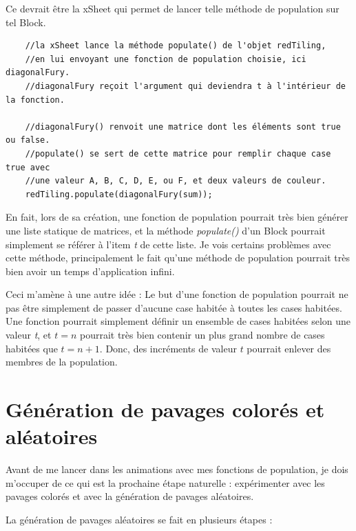 Ce devrait être la xSheet qui permet de lancer telle méthode de population sur tel Block.
\begin{lstlisting}
    //la xSheet lance la méthode populate() de l'objet redTiling, 
    //en lui envoyant une fonction de population choisie, ici diagonalFury.
    //diagonalFury reçoit l'argument qui deviendra t à l'intérieur de la fonction.

    //diagonalFury() renvoit une matrice dont les éléments sont true ou false.
    //populate() se sert de cette matrice pour remplir chaque case true avec
    //une valeur A, B, C, D, E, ou F, et deux valeurs de couleur.
    redTiling.populate(diagonalFury(sum));
\end{lstlisting}

En fait, lors de sa création, une fonction de population pourrait très bien générer une liste statique de matrices, et la méthode \textit{populate()} d'un Block pourrait simplement se référer à l'item \textit{t} de cette liste. Je vois certains problèmes avec cette méthode, principalement le fait qu'une méthode de population pourrait très bien avoir un temps d'application infini.

Ceci m'amène à une autre idée : Le but d'une fonction de population pourrait ne pas être simplement de passer d'aucune case habitée à toutes les cases habitées. Une fonction pourrait simplement définir un ensemble de cases habitées selon une valeur \textit{t}, et $t = n$ pourrait très bien contenir un plus grand nombre de cases habitées que $t = n+1$. Donc, des incréments de valeur $t$ pourrait enlever des membres de la population.

\newpage
\section{Génération de pavages colorés et aléatoires}

Avant de me lancer dans les animations avec mes fonctions de population, je dois m'occuper de ce qui est la prochaine étape naturelle : expérimenter avec les pavages colorés et avec la génération de pavages aléatoires.

La génération de pavages aléatoires se fait en plusieurs étapes :

